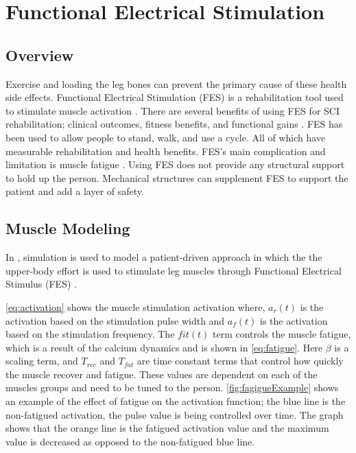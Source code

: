 \section{Functional Electrical Stimulation}
\label{sec:FES}
\subsection{Overview}

Exercise and loading the leg bones can prevent the primary cause of these health side effects. Functional Electrical Stimulation (FES) is a rehabilitation tool used to stimulate muscle activation  \cite{quintero2012preliminary}. There are several benefits of using FES for SCI rehabilitation; clinical outcomes, fitness benefits, and functional gains \cite{hamid2008role}. FES has been used to allow people to stand, walk, and use a cycle\cite{mazzoleni2013fes}. All of which have measurable rehabilitation and health benefits. FES's main complication and limitation is muscle fatigue \cite{karu1995reducing}. Using FES  does not provide any structural support to hold up the person. Mechanical structures can supplement FES to support the patient and add a layer of safety. 

\subsection{Muscle Modeling}
 In \cite{reiner1998patient}, simulation is used to model a patient-driven approach in which the the upper-body effort is used to stimulate leg muscles through Functional Electrical Stimulus (FES) \cite{lynch2008functional} \cite{rushton1997functional}. 
 
 \autoref{eq:activation} shows the muscle stimulation activation where, $a_r(t)$ is the activation based on the stimulation pulse width and $a_f(t)$ is the activation based on the stimulation frequency. The $fit(t)$ term controls the muscle fatigue, which is a result of the calcium dynamics and is shown in \autoref{eq:fatigue}. Here $\beta$ is a scaling term, and $T_{rec}$ and $T_{fat}$ are time constant terms that control how quickly the muscle recover and fatigue. These values are dependent on each of the muscles groups and need to be tuned to the person. \autoref{fig:fagigueExample} shows an example of the effect of fatigue on the activation function; the blue line is the non-fatigued activation, the pulse value is being controlled over time. The graph shows that the orange line is the fatigued activation value and the maximum value is decreased as opposed to the non-fatigued blue line.
 
